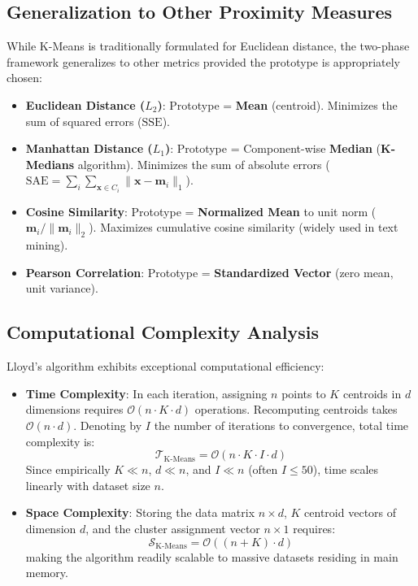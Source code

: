 \subsection{Generalization to Other Proximity Measures}

While K-Means is traditionally formulated for Euclidean distance, the two-phase framework generalizes to other metrics provided the prototype is appropriately chosen:
\begin{itemize}
    \item \textbf{Euclidean Distance ($L_2$)}: Prototype = \textbf{Mean} (centroid). Minimizes the sum of squared errors ($\mathrm{SSE}$).
    \item \textbf{Manhattan Distance ($L_1$)}: Prototype = Component-wise \textbf{Median} (\textbf{K-Medians} algorithm). Minimizes the sum of absolute errors ($\mathrm{SAE} = \sum_{i} \sum_{\mathbf{x} \in C_i} \|\mathbf{x} - \mathbf{m}_i\|_1$).
    \item \textbf{Cosine Similarity}: Prototype = \textbf{Normalized Mean} to unit norm ($\mathbf{m}_i / \|\mathbf{m}_i\|_2$). Maximizes cumulative cosine similarity (widely used in text mining).
    \item \textbf{Pearson Correlation}: Prototype = \textbf{Standardized Vector} (zero mean, unit variance).
\end{itemize}

\subsection{Computational Complexity Analysis}

Lloyd's algorithm exhibits exceptional computational efficiency:
\begin{itemize}
    \item \textbf{Time Complexity}: In each iteration, assigning $n$ points to $K$ centroids in $d$ dimensions requires $\mathcal{O}(n \cdot K \cdot d)$ operations. Recomputing centroids takes $\mathcal{O}(n \cdot d)$. Denoting by $I$ the number of iterations to convergence, total time complexity is:
    \begin{equation}
        \mathcal{T}_{\text{K-Means}} = \mathcal{O}(n \cdot K \cdot I \cdot d)
    \end{equation}
    Since empirically $K \ll n$, $d \ll n$, and $I \ll n$ (often $I \le 50$), time scales linearly with dataset size $n$.
    \item \textbf{Space Complexity}: Storing the data matrix $n \times d$, $K$ centroid vectors of dimension $d$, and the cluster assignment vector $n \times 1$ requires:
    \begin{equation}
        \mathcal{S}_{\text{K-Means}} = \mathcal{O}((n + K) \cdot d)
    \end{equation}
    making the algorithm readily scalable to massive datasets residing in main memory.
\end{itemize}

